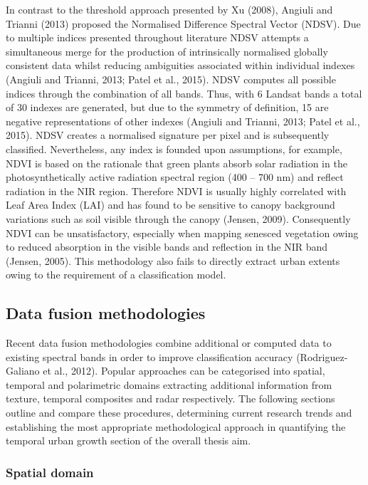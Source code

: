 \documentclass[]{book}
\begin{document}
In contrast to the threshold approach presented by Xu (2008), Angiuli
and Trianni (2013) proposed the Normalised Difference Spectral Vector
(NDSV). Due to multiple indices presented throughout literature NDSV
attempts a simultaneous merge for the production of intrinsically
normalised globally consistent data whilst reducing ambiguities
associated within individual indexes (Angiuli and Trianni, 2013; Patel
et al., 2015). NDSV computes all possible indices through the
combination of all bands. Thus, with 6 Landsat bands a total of 30
indexes are generated, but due to the symmetry of definition, 15 are
negative representations of other indexes (Angiuli and Trianni, 2013;
Patel et al., 2015). NDSV creates a normalised signature per pixel and
is subsequently classified. Nevertheless, any index is founded upon
assumptions, for example, NDVI is based on the rationale that green
plants absorb solar radiation in the photosynthetically active radiation
spectral region (400 -- 700 nm) and reflect radiation in the NIR region.
Therefore NDVI is usually highly correlated with Leaf Area Index (LAI)
and has found to be sensitive to canopy background variations such as
soil visible through the canopy (Jensen, 2009). Consequently NDVI can be
unsatisfactory, especially when mapping senesced vegetation owing to
reduced absorption in the visible bands and reflection in the NIR band
(Jensen, 2005). This methodology also fails to directly extract urban
extents owing to the requirement of a classification model.

\subsection{Data fusion methodologies}\label{data-fusion-methodologies}

Recent data fusion methodologies combine additional or computed data to
existing spectral bands in order to improve classification accuracy
(Rodriguez-Galiano et al., 2012). Popular approaches can be categorised
into spatial, temporal and polarimetric domains extracting additional
information from texture, temporal composites and radar respectively.
The following sections outline and compare these procedures, determining
current research trends and establishing the most appropriate
methodological approach in quantifying the temporal urban growth section
of the overall thesis aim.

\subsubsection{Spatial domain}\label{spatial-domain}
\end{document}
